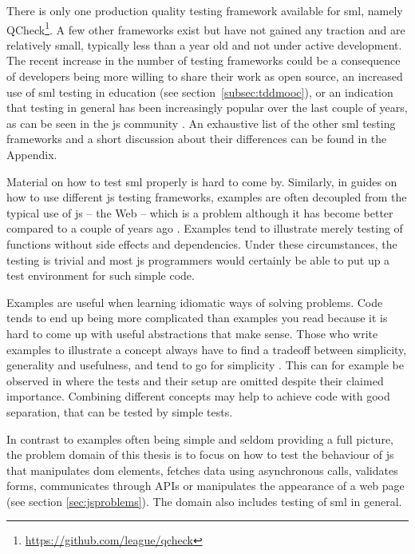 \documentclass[11pt]{article}
\begin{document}
There is only one production quality testing framework available for \gls{sml}, namely QCheck\footnote{\url{https://github.com/league/qcheck}}. A few other frameworks exist but have not gained any traction and are relatively small, typically less than a year old and not under active development. The recent increase in the number of testing frameworks could be a consequence of developers being more willing to share their work as open source, an increased use of \gls{sml} testing in education (see section~\ref{subsec:tddmooc}), or an indication that testing in general has been increasingly popular over the last couple of years, as can be seen in the \gls{js} community \cite[question~1]{Edelstam}. An exhaustive list of the other \gls{sml} testing frameworks and a short discussion about their differences can be found in the Appendix.

Material on how to test \gls{sml} properly is hard to come by. Similarly, in guides on how to use different \gls{js} testing frameworks, examples are often decoupled from the typical use of \gls{js} -- the Web -- which is a problem \cite[question~3]{Ekelof} although it has become better compared to a couple of years ago \cite[question~27]{Ahnve}. Examples tend to illustrate merely testing of functions without side effects and dependencies. Under these circumstances, the testing is trivial and most \gls{js} programmers would certainly be able to put up a test environment for such simple code.

Examples are useful when learning idiomatic ways of solving problems. Code tends to end up being more complicated than examples you read because it is hard to come up with useful abstractions that make sense. Those who write examples to illustrate a concept always have to find a tradeoff between simplicity, generality and usefulness, and tend to go for simplicity \cite[questions~56-57]{Edelstam}. This can for example be observed in \cite[p.~13-45]{Refactoring} where the tests and their setup are omitted despite their claimed importance. Combining different concepts may help to achieve code with good separation, that can be tested by simple tests.

In contrast to examples often being simple and seldom providing a full picture, the problem domain of this thesis is to focus on how to test the behaviour of \gls{js} that manipulates \gls{dom} elements, fetches data using asynchronous calls, validates forms, communicates through APIs or manipulates the appearance of a web page (see section \ref{sec:jsproblems}). The domain also includes testing of \gls{sml} in general.
\end{document}
